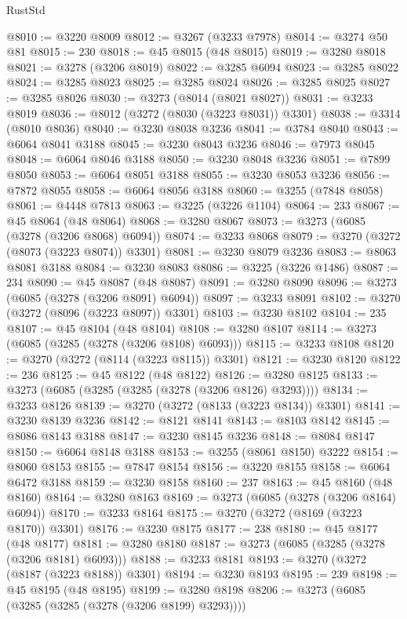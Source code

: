 \begin{lexlean}{RustStd}
\begin{coremodule}
@8010 := @3220 @8009
@8012 := @3267 (@3233 @7978)
@8014 := @3274 @50 @81
@8015 := 230
@8018 := @45 @8015 (@48 @8015)
@8019 := @3280 @8018
@8021 := @3278 (@3206 @8019)
@8022 := @3285 @6094
@8023 := @3285 @8022
@8024 := @3285 @8023
@8025 := @3285 @8024
@8026 := @3285 @8025
@8027 := @3285 @8026
@8030 := @3273 (@8014 (@8021 @8027))
@8031 := @3233 @8019
@8036 := @8012 (@3272 (@8030 (@3223 @8031)) @3301)
@8038 := @3314 (@8010 @8036)
@8040 := @3230 @8038 @3236
@8041 := @3784 @8040
@8043 := @6064 @8041 @3188
@8045 := @3230 @8043 @3236
@8046 := @7973 @8045
@8048 := @6064 @8046 @3188
@8050 := @3230 @8048 @3236
@8051 := @7899 @8050
@8053 := @6064 @8051 @3188
@8055 := @3230 @8053 @3236
@8056 := @7872 @8055
@8058 := @6064 @8056 @3188
@8060 := @3255 (@7848 @8058)
@8061 := @4448 @7813
@8063 := @3225 (@3226 @1104)
@8064 := 233
@8067 := @45 @8064 (@48 @8064)
@8068 := @3280 @8067
@8073 := @3273 (@6085 (@3278 (@3206 @8068) @6094))
@8074 := @3233 @8068
@8079 := @3270 (@3272 (@8073 (@3223 @8074)) @3301)
@8081 := @3230 @8079 @3236
@8083 := @8063 @8081 @3188
@8084 := @3230 @8083
@8086 := @3225 (@3226 @1486)
@8087 := 234
@8090 := @45 @8087 (@48 @8087)
@8091 := @3280 @8090
@8096 := @3273 (@6085 (@3278 (@3206 @8091) @6094))
@8097 := @3233 @8091
@8102 := @3270 (@3272 (@8096 (@3223 @8097)) @3301)
@8103 := @3230 @8102
@8104 := 235
@8107 := @45 @8104 (@48 @8104)
@8108 := @3280 @8107
@8114 := @3273 (@6085 (@3285 (@3278 (@3206 @8108) @6093)))
@8115 := @3233 @8108
@8120 := @3270 (@3272 (@8114 (@3223 @8115)) @3301)
@8121 := @3230 @8120
@8122 := 236
@8125 := @45 @8122 (@48 @8122)
@8126 := @3280 @8125
@8133 := @3273 (@6085 (@3285 (@3285 (@3278 (@3206 @8126) @3293))))
@8134 := @3233 @8126
@8139 := @3270 (@3272 (@8133 (@3223 @8134)) @3301)
@8141 := @3230 @8139 @3236
@8142 := @8121 @8141
@8143 := @8103 @8142
@8145 := @8086 @8143 @3188
@8147 := @3230 @8145 @3236
@8148 := @8084 @8147
@8150 := @6064 @8148 @3188
@8153 := @3255 (@8061 @8150) @3222
@8154 := @8060 @8153
@8155 := @7847 @8154
@8156 := @3220 @8155
@8158 := @6064 @6472 @3188
@8159 := @3230 @8158
@8160 := 237
@8163 := @45 @8160 (@48 @8160)
@8164 := @3280 @8163
@8169 := @3273 (@6085 (@3278 (@3206 @8164) @6094))
@8170 := @3233 @8164
@8175 := @3270 (@3272 (@8169 (@3223 @8170)) @3301)
@8176 := @3230 @8175
@8177 := 238
@8180 := @45 @8177 (@48 @8177)
@8181 := @3280 @8180
@8187 := @3273 (@6085 (@3285 (@3278 (@3206 @8181) @6093)))
@8188 := @3233 @8181
@8193 := @3270 (@3272 (@8187 (@3223 @8188)) @3301)
@8194 := @3230 @8193
@8195 := 239
@8198 := @45 @8195 (@48 @8195)
@8199 := @3280 @8198
@8206 := @3273 (@6085 (@3285 (@3285 (@3278 (@3206 @8199) @3293))))

\end{coremodule}
\end{lexlean}
